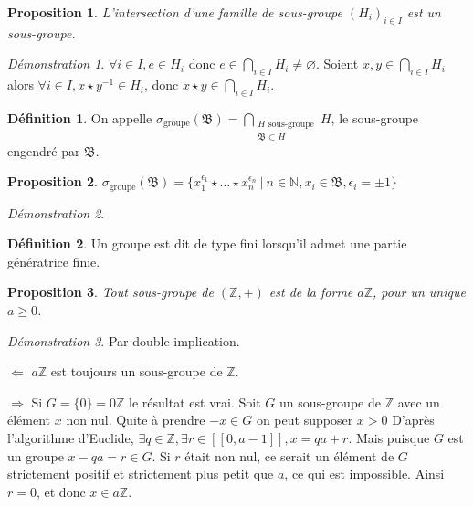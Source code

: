 \documentclass[a4paper, 11pt, french]{book}
\newenvironment{itemise}{\itemize}{\enditemize}
\let\colour=\color
\theoremstyle{plain} %
\newtheorem{proposition}{Proposition}
\theoremstyle{definition} %
\newtheorem{definition}{Définition}
\theoremstyle{remark} %
\newtheorem*{demonstration}{Démonstration}
\newcommand{\1}{\mathds{1}}
\newcommand\vide{\varnothing}
\newcommand{\supegal}{\geqslant}
\newcommand{\inv}[1]{#1^{-1}}
\newcommand{\N}{\mathbb{N}}
\newcommand{\Z}{\mathbb{Z}}
\newcommand\ens[2]{\{#1 \ |\ #2\}}
\begin{document}
\begin{proposition}
	L'intersection d'une famille de sous-groupe $(H_i)_{i\in I}$ est un sous-groupe.
\end{proposition}

\begin{demonstration}
	$\forall i\in I, e\in H_i$ donc $e\in\bigcap_{i\in I}H_i\neq\vide$.
	Soient $x, y\in\bigcap_{i\in I}H_i$ alors $\forall i\in I, x\star\inv{y}\in H_i$, donc $x\star y\in\bigcap_{i\in I}H_i$.
\end{demonstration}

\begin{definition}
	On appelle $\sigma_\text{groupe}(\mathfrak{B})=\bigcap_{\substack{H\text{ sous-groupe}\\\mathfrak{B}\subset H}}H$, le sous-groupe engendré par $\mathfrak{B}$.
\end{definition}

\begin{proposition}
	$\sigma_\text{groupe}(\mathfrak{B})=\ens{x_1^{\epsilon_1}\star\dots\star x_n^{\epsilon_n}}{n\in\N, x_i\in\mathfrak{B}, \epsilon_i=\pm1}$
\end{proposition}

\begin{demonstration}
	\colour{red}{À démontrer}
\end{demonstration}

\begin{definition}
	Un groupe est dit de type fini lorsqu'il admet une partie génératrice finie.
\end{definition}

\begin{proposition}
	Tout sous-groupe de $(\Z, +)$ est de la forme $a\Z$, pour un unique $a\supegal0$.
\end{proposition}

\begin{demonstration}
	Par double implication.
	\begin{itemise}
		\item[$\Leftarrow$] $a\Z$ est toujours un sous-groupe de $\Z$.
		\item[$\Rightarrow$] Si $G=\{0\}=0\Z$ le résultat est vrai.
		Soit $G$ un sous-groupe de $\Z$ avec un élément $x$ non nul.
		Quite à prendre $-x\in G$ on peut supposer $x>0$
		D'après l'algorithme d'Euclide, $\exists q\in\Z, \exists r\in[\![0, a-1]\!], x = qa + r$.
		Mais puisque $G$ est un groupe $x-qa=r\in G$.
		Si $r$ était non nul, ce serait un élément de $G$ strictement positif et strictement plus petit que $a$, ce qui est impossible.
		Ainsi $r=0$, et donc $x\in a\Z$.
	\end{itemise}
\end{demonstration}
\end{document}
